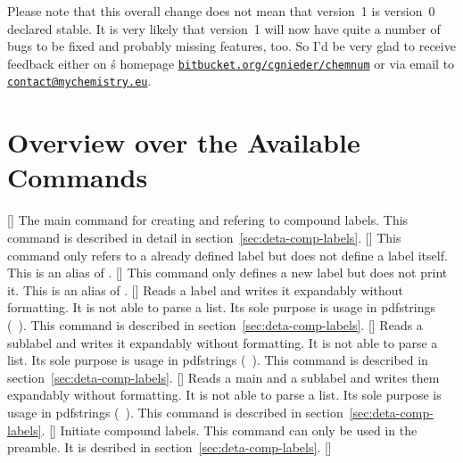 \documentclass[load-preamble+,babel-options={ngerman,british,american}]{cnltx-doc}
\newcommand*\email[1]{\texttt{\href{mailto:#1}{#1}}}
\newcommand*\securewebsite[1]{\texttt{\href{https://#1/}{#1}}}
\begin{document}
Please note that this overall change does not mean that version~1 is version~0
declared stable.  It is very likely that version~1 will now have quite a
number of bugs to be fixed and probably missing features, too.  So I'd be very
glad to receive feedback either on \chemnum\'s homepage
\securewebsite{bitbucket.org/cgnieder/chemnum} or via email to
\email{contact@mychemistry.eu}.

\section{Overview over the Available Commands}\label{sec:overv-over-avail}

\begin{commands}
  [\sarg\code{+}]
    The main command for creating and refering to compound labels.  This
    command is described in detail in section~\ref{sec:deta-comp-labels}.
  []
    This command only refers to a already defined label but does not define a
    label itself.  This is an alias of \code{+}.
  []
    This command only defines a new label but does not print it.  This is an
    alias of \sarg.
  \expandable{}[]
    Reads a label and writes it expandably without formatting.  It is not able
    to parse a list.  Its sole purpose is usage in pdfstrings
    (\cf\ \marg{\TeX}).  This command is
    described in section~\ref{sec:deta-comp-labels}.
  \expandable{}[]
    Reads a sublabel and writes it expandably without formatting.  It is not
    able to parse a list.  Its sole purpose is usage in pdfstrings
    (\cf\ \marg{\TeX}).  This command is
    described in section~\ref{sec:deta-comp-labels}.
  \expandable{}[]
    Reads a main and a sublabel and writes them expandably without formatting.
    It is not able to parse a list.  Its sole purpose is usage in pdfstrings
    (\cf\ \marg{\TeX}).  This command is
    described in section~\ref{sec:deta-comp-labels}.
  []
    Initiate compound labels.  This command can only be used in the preamble.
    It is desribed in section~\ref{sec:deta-comp-labels}.
  \expandable{}[]

\end{commands}
\end{document}

